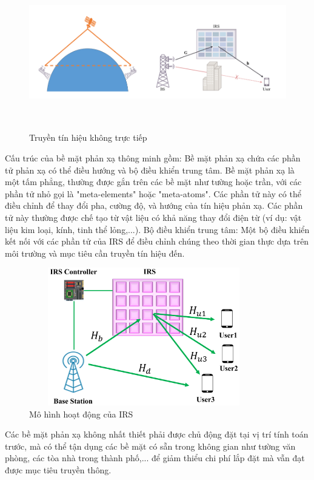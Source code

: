 \documentclass{article}
\begin{document}
\begin{figure}[h!]
    \centering
    \includegraphics[width =14cm, height = 6cm]{photo/2.4.1.png}\\
   \caption{Truyền tín hiệu không trực tiếp}
    \label{Hình 5}
\end{figure}
\newpage
Cấu trúc của bề mặt phản xạ thông minh gồm: Bề mặt phản xạ chứa các phần tử phản xạ có thể điều hướng và bộ điều khiển trung tâm. Bề mặt phản xạ là một tấm phẳng, thường được gắn trên các bề mặt như tường hoặc trần, với các phần tử nhỏ gọi là "meta-elements" hoặc "meta-atoms". Các phần tử này có  thể điều chỉnh để thay đổi pha, cường độ, và hướng của tín hiệu phản xạ. Các phần tử này thường được chế tạo từ vật liệu có khả năng thay đổi điện từ (ví dụ: vật liệu kim loại, kính, tinh thể lỏng,...). Bộ điều khiển trung tâm: Một bộ điều khiển kết nối với các phần tử của IRS để điều chỉnh chúng theo thời gian thực dựa trên môi trường và mục tiêu cần truyền tín hiệu đến.\\
\begin{figure}[h!]
    \centering
    \includegraphics[width = 10cm, height = 6cm]{photo/2.4.2.png}
    \caption{Mô hình hoạt động của IRS}
    \label{Hình 6}
\end{figure}

Các bề mặt phản xạ không nhất thiết phải được chủ động đặt tại vị trí tính toán trước, mà có thể tận dụng các bề mặt có sẵn trong không gian như tường văn phòng, các tòa nhà trong thành phố,... để giảm thiểu chi phí lắp đặt mà vẫn đạt được mục tiêu truyền thông.\\
\end{document}
